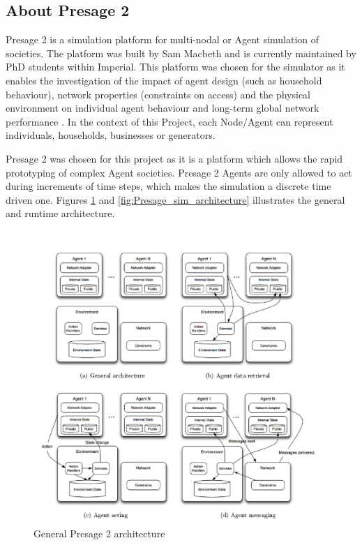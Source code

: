\subsection*{About Presage 2}
Presage 2 is a simulation platform for multi-nodal or Agent simulation of societies. The platform was built by Sam Macbeth and is currently maintained by PhD students within Imperial. This platform was chosen for the simulator as it enables the investigation of the impact of agent design (such as household behaviour), network properties (constraints on access) and the physical environment on individual agent behaviour and long-term global network performance \cite{Presage2-Desc:2015}. In the context of this Project, each Node/Agent can represent individuals, households, businesses or generators. 

Presage 2 was chosen for this project as it is a platform which allows the rapid prototyping of complex Agent societies. Presage 2 Agents are only allowed to act during increments of time steps, which makes the simulation a discrete time driven one. Figures \ref{fig:Presage_architecture} and \ref{fig:Presage_sim_architecture} illustrates the general and runtime architecture.

\begin{figure}[h!]
	\centering
	\includegraphics[scale=0.25]{Images/Presage.jpg}
	\caption{General Presage 2 architecture \cite{Presage_Kyoto:2015}}
	\label{fig:Presage_architecture}
\end{figure}

